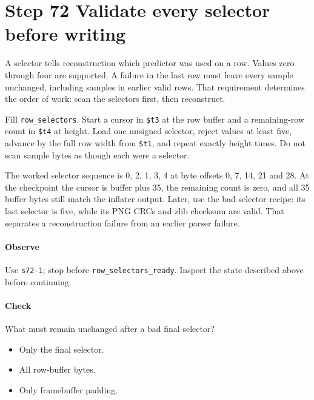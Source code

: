 \section{Step 72 Validate every selector before writing}
A selector tells reconstruction which predictor was used on a row. Values zero through four are supported. A failure in the last row must leave every sample unchanged, including samples in earlier valid rows. That requirement determines the order of work: scan the selectors first, then reconstruct.

Fill \texttt{row\_selectors}. Start a cursor in \texttt{\$t3} at the row buffer and a remaining-row count in \texttt{\$t4} at height. Load one unsigned selector, reject values at least five, advance by the full row width from \texttt{\$t1}, and repeat exactly height times. Do not scan sample bytes as though each were a selector.

The worked selector sequence is 0, 2, 1, 3, 4 at byte offsets 0, 7, 14, 21 and 28. At the checkpoint the cursor is buffer plus 35, the remaining count is zero, and all 35 buffer bytes still match the inflater output. Later, use the bad-selector recipe: its last selector is five, while its PNG CRCs and zlib checksum are valid. That separates a reconstruction failure from an earlier parser failure.

\paragraph{Observe} Use \texttt{s72-1}; stop before \texttt{row\_selectors\_ready}. Inspect the state described above before continuing.

\paragraph{Check} What must remain unchanged after a bad final selector?
\begin{itemize}
\item[A.] Only the final selector.
\item[B.] All row-buffer bytes.
\item[C.] Only framebuffer padding.
\end{itemize}
